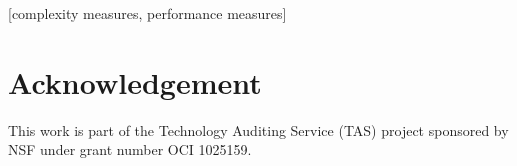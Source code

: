 \documentclass{sig-alternate}
\begin{document}
[complexity measures, performance measures]







%

%






%






\section*{Acknowledgement}

This work is part of the Technology Auditing Service (TAS) project sponsored by NSF under grant number OCI 1025159.

\clearpage


%

\end{document}
